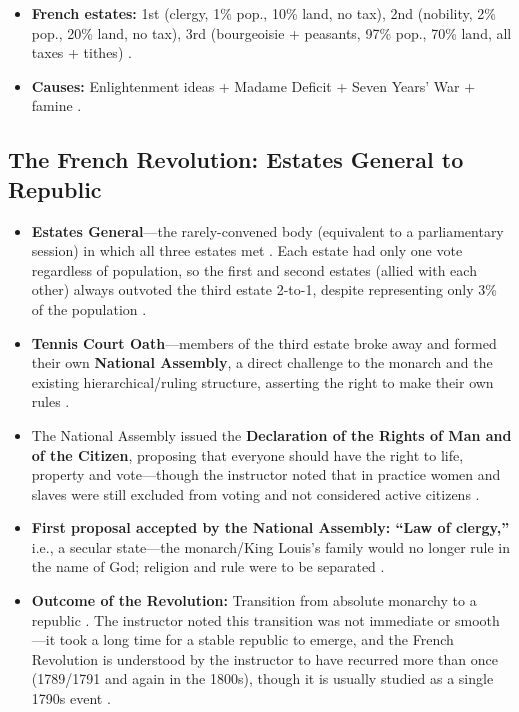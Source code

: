 \begin{QuickRevision}
\begin{itemize}
    \item \textbf{French estates:} 1st (clergy, 1\% pop., 10\% land, no tax), 2nd (nobility, 2\% pop., 20\% land, no tax), 3rd (bourgeoisie + peasants, 97\% pop., 70\% land, all taxes + tithes) .
    \item \textbf{Causes:} Enlightenment ideas + Madame Deficit + Seven Years' War + famine .
\end{itemize}
\end{QuickRevision}

\subsection{The French Revolution: Estates General to Republic}

\begin{GovtPolicy}
\begin{itemize}
    \item \textbf{Estates General}---the rarely-convened body (equivalent to a parliamentary session) in which all three estates met . Each estate had only one vote regardless of population, so the first and second estates (allied with each other) always outvoted the third estate 2-to-1, despite representing only 3\% of the population .
    \item \textbf{Tennis Court Oath}---members of the third estate broke away and formed their own \textbf{National Assembly}, a direct challenge to the monarch and the existing hierarchical/ruling structure, asserting the right to make their own rules .
    \item The National Assembly issued the \textbf{Declaration of the Rights of Man and of the Citizen}, proposing that everyone should have the right to life, property and vote---though the instructor noted that in practice women and slaves were still excluded from voting and not considered active citizens .
\end{itemize}
\end{GovtPolicy}

\begin{GovtPolicy}
\begin{itemize}
    \item \textbf{First proposal accepted by the National Assembly: ``Law of clergy,''} i.e., a secular state---the monarch/King Louis's family would no longer rule in the name of God; religion and rule were to be separated .
    \item \textbf{Outcome of the Revolution:} Transition from absolute monarchy to a republic . The instructor noted this transition was not immediate or smooth---it took a long time for a stable republic to emerge, and the French Revolution is understood by the instructor to have recurred more than once (1789/1791 and again in the 1800s), though it is usually studied as a single 1790s event .
\end{itemize}
\end{GovtPolicy}

